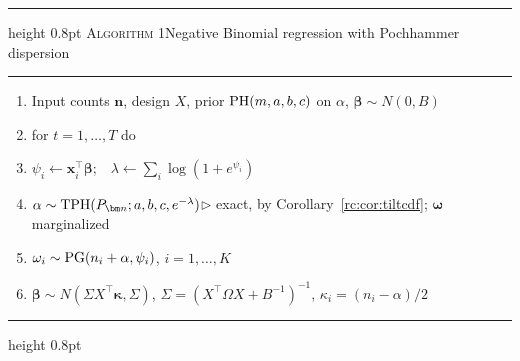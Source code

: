 \begin{center}
\begin{minipage}{\textwidth}
\small
\hrule height 0.8pt\smallskip
\textsc{Algorithm 1}\enspace Negative Binomial regression with Pochhammer dispersion
\smallskip\hrule\smallskip
\begin{enumerate}[label={\footnotesize\arabic*:},leftmargin=1.8em,itemsep=1pt,topsep=0pt]
\item Input counts $\bm n$, design $X$, prior $\mathrm{PH}(m,a,b,c)$ on $\alpha$, $\bm\beta\sim N(0,B)$
\item for $t=1,\dots,T$ do
\item \hspace{1em}$\psi_i\leftarrow\bm x_i^\top\bm\beta$;\ \ $\lambda\leftarrow\sum_i\log(1+e^{\psi_i})$
\item \hspace{1em}$\alpha\sim\rcTPH(P_{\bm n};a,b,c,e^{-\lambda})$\hfill$\triangleright$ exact, by Corollary~\ref{rc:cor:tiltcdf}; $\bm\omega$ marginalized
\item \hspace{1em}$\omega_i\sim\mathrm{PG}(n_i+\alpha,\psi_i)$, $i=1,\dots,K$
\item \hspace{1em}$\bm\beta\sim N(\Sigma X^\top\bm\kappa,\Sigma)$, $\Sigma=(X^\top\Omega X+B^{-1})^{-1}$, $\kappa_i=(n_i-\alpha)/2$
\end{enumerate}
\smallskip\hrule height 0.8pt
\end{minipage}
\end{center}

